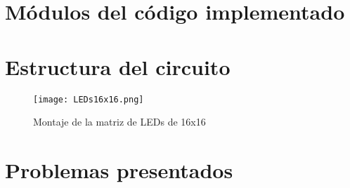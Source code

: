 \documentclass{article}
\begin{document}
\section{Módulos del código implementado} \label{Modulos}

\section{Estructura del circuito} \label{circuito}

\begin{figure}[h]
\texttt{[image: LEDs16x16.png]}
\centering
\caption{Montaje de la matriz de LEDs de 16x16}
\label{fig:punto1}
\end{figure}


\section{Problemas presentados} \label{problemas}
\end{document}
